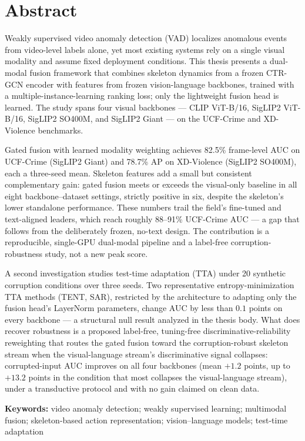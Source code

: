 \chapter*{Abstract}

Weakly supervised video anomaly detection (VAD) localizes anomalous events
from video-level labels alone, yet most existing systems rely on a single
visual modality and assume fixed deployment conditions. This thesis presents
a dual-modal fusion framework that combines skeleton dynamics from a frozen
CTR-GCN encoder with features from frozen vision-language backbones, trained
with a multiple-instance-learning ranking loss; only the lightweight fusion
head is learned. The study spans four visual backbones --- CLIP ViT-B/16,
SigLIP2 ViT-B/16, SigLIP2 SO400M, and SigLIP2 Giant --- on the UCF-Crime and
XD-Violence benchmarks.

Gated fusion with learned modality weighting achieves 82.5\% frame-level AUC
on UCF-Crime (SigLIP2 Giant) and 78.7\% AP on XD-Violence (SigLIP2 SO400M),
each a three-seed mean. Skeleton features add a small but consistent
complementary gain: gated fusion meets or exceeds the visual-only baseline in
all eight backbone--dataset settings, strictly positive in six, despite the
skeleton's lower standalone performance. These numbers trail the field's
fine-tuned and text-aligned leaders, which reach roughly 88--91\% UCF-Crime
AUC --- a gap that follows from the deliberately frozen, no-text design. The
contribution is a reproducible, single-GPU dual-modal pipeline and a
label-free corruption-robustness study, not a new peak score.

A second investigation studies test-time adaptation (TTA) under 20 synthetic
corruption conditions over three seeds. Two representative entropy-minimization TTA methods (TENT, SAR),
restricted by the architecture to adapting only the fusion head's LayerNorm
parameters, change AUC by less than $0.1$ points on every backbone --- a structural null
result analyzed in the thesis body. What does recover robustness is a
proposed label-free, tuning-free discriminative-reliability reweighting that
routes the gated fusion toward the corruption-robust skeleton stream when the
visual-language stream's discriminative signal collapses: corrupted-input AUC
improves on all four backbones (mean $+1.2$ points, up to $+13.2$ points in
the condition that most collapses the visual-language stream), under a
transductive protocol and with no gain claimed on clean data.

\vspace{1.5em}
\noindent\textbf{Keywords:} video anomaly detection; weakly supervised
learning; multimodal fusion; skeleton-based action representation;
vision--language models; test-time adaptation
